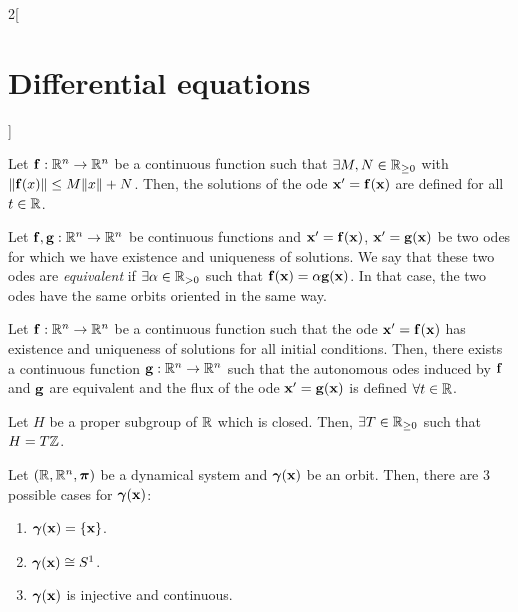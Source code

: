 \documentclass[../../../main.tex]{subfiles}
\begin{document}
\begin{multicols}{2}[\section{Differential equations}]
\begin{lemma}
  \end{lemma}
  \begin{lemma}
    Let $\boldsymbol{\mathrm{f}}:\mathbb{R}^n\rightarrow\mathbb{R}^n$ be a continuous function such that $\exists M,N\in\mathbb{R}_{\geq 0}$ with $\|\boldsymbol{\mathrm{f}}(x)\|\leq M\|x\|+N$. Then, the solutions of the ode $\boldsymbol{\mathrm{x}}' =\boldsymbol{\mathrm{f}}(\boldsymbol{\mathrm{x}})$ are defined for all $t\in\mathbb{R}$.
  \end{lemma}
  \begin{definition}
    Let $\boldsymbol{\mathrm{f}},\boldsymbol{\mathrm{g}}:\mathbb{R}^n\rightarrow\mathbb{R}^n$ be continuous functions and $\boldsymbol{\mathrm{x}}' =\boldsymbol{\mathrm{f}}(\boldsymbol{\mathrm{x}})$, $\boldsymbol{\mathrm{x}}' =\boldsymbol{\mathrm{g}}(\boldsymbol{\mathrm{x}})$ be two odes for which we have existence and uniqueness of solutions. We say that these two odes are \textit{equivalent} if $\exists \alpha\in\mathbb{R}_{>0}$ such that $\boldsymbol{\mathrm{f}}(\boldsymbol{\mathrm{x}})=\alpha \boldsymbol{\mathrm{g}}(\boldsymbol{\mathrm{x}})$. In that case, the two odes have the same orbits oriented in the same way.
  \end{definition}
  \begin{corollary}
    Let $\boldsymbol{\mathrm{f}}:\mathbb{R}^n\rightarrow\mathbb{R}^n$ be a continuous function such that the ode $\boldsymbol{\mathrm{x}}' =\boldsymbol{\mathrm{f}}(\boldsymbol{\mathrm{x}})$ has existence and uniqueness of solutions for all initial conditions. Then, there exists a continuous function $\boldsymbol{\mathrm{g}}:\mathbb{R}^n\rightarrow\mathbb{R}^n$ such that the autonomous odes induced by $\boldsymbol{\mathrm{f}}$ and $\boldsymbol{\mathrm{g}}$ are equivalent and the flux of the ode $\boldsymbol{\mathrm{x}}' =\boldsymbol{\mathrm{g}}(\boldsymbol{\mathrm{x}})$ is defined $\forall t\in\mathbb{R}$.
  \end{corollary}
  \begin{lemma}
    Let $H$ be a proper subgroup of $\mathbb{R}$ which is closed. Then, $\exists T\in\mathbb{R}_{\geq 0}$ such that $H=T\mathbb{Z}$.
  \end{lemma}
  \begin{prop}
    Let $(\mathbb{R},\mathbb{R}^n,\boldsymbol{\mathrm{\pi}})$ be a dynamical system and $\boldsymbol{\mathrm{\gamma}}(\boldsymbol{\mathrm{x}})$ be an orbit. Then, there are 3 possible cases for $\boldsymbol{\mathrm{\gamma}}(\boldsymbol{\mathrm{x}})$:
    \begin{enumerate}
      \item $\boldsymbol{\mathrm{\gamma}}(\boldsymbol{\mathrm{x}})=\{\boldsymbol{\mathrm{x}}\}$.
      \item $\boldsymbol{\mathrm{\gamma}}(\boldsymbol{\mathrm{x}})\cong S^1$.
      \item $\boldsymbol{\mathrm{\gamma}}(\boldsymbol{\mathrm{x}})$ is injective and continuous.

\end{enumerate}
\end{prop}
\end{multicols}
\end{document}
